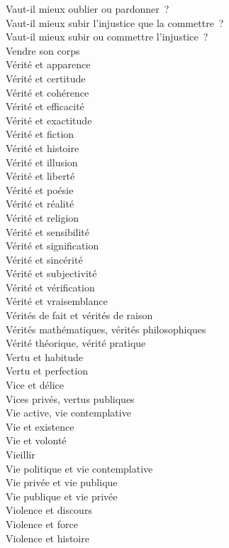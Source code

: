 \documentclass[a4paper,12pt]{article}
\begin{document}
Vaut-il mieux oublier ou pardonner ? \\
Vaut-il mieux subir l'injustice que la commettre ? \\
Vaut-il mieux subir ou commettre l'injustice ? \\
Vendre son corps \\
Vérité et apparence \\
Vérité et certitude \\
Vérité et cohérence \\
Vérité et efficacité \\
Vérité et exactitude \\
Vérité et fiction \\
Vérité et histoire \\
Vérité et illusion \\
Vérité et liberté \\
Vérité et poésie \\
Vérité et réalité \\
Vérité et religion \\
Vérité et sensibilité \\
Vérité et signification \\
Vérité et sincérité \\
Vérité et subjectivité \\
Vérité et vérification \\
Vérité et vraisemblance \\
Vérités de fait et vérités de raison \\
Vérités mathématiques, vérités philosophiques \\
Vérité théorique, vérité pratique \\
Vertu et habitude \\
Vertu et perfection \\
Vice et délice \\
Vices privés, vertus publiques \\
Vie active, vie contemplative \\
Vie et existence \\
Vie et volonté \\
Vieillir \\
Vie politique et vie contemplative \\
Vie privée et vie publique \\
Vie publique et vie privée \\
Violence et discours \\
Violence et force \\
Violence et histoire \\
\end{document}
